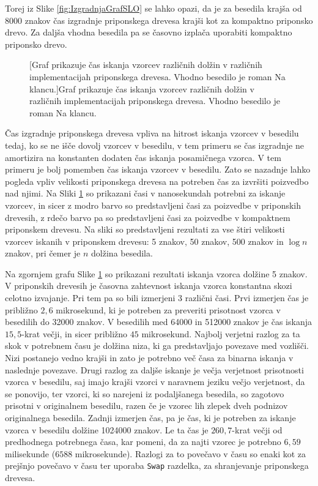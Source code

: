 Torej iz Slike \ref{fig:IzgradnjaGrafSLO} se lahko opazi, da je za besedila krajša od 8000 znakov čas izgradnje priponskega drevesa krajši kot za kompaktno priponsko drevo. Za daljša vhodna besedila pa se časovno izplača uporabiti kompaktno priponsko drevo.


\begin{figure}[htb]
    
    [Graf prikazuje čas iskanja vzorcev različnih dolžin v različnih implementacijah priponskega drevesa. Vhodno besedilo je roman Na klancu.]{Graf prikazuje čas iskanja vzorcev različnih dolžin v različnih implementacijah priponskega drevesa. Vhodno besedilo je roman Na klancu.} 
    \label{fig:IskanjeGrafSLO}
\end{figure}

Čas izgradnje priponskega drevesa vpliva na hitrost iskanja  vzorcev v besedilu tedaj, ko se ne išče dovolj vzorcev v besedilu, v tem primeru se čas izgradnje ne amortizira na konstanten dodaten čas iskanja posamičnega vzorca. V tem primeru je bolj pomemben čas iskanja vzorcev v besedilu. Zato se nazadnje lahko pogleda vpliv velikosti priponskega drevesa na potreben čas za izvršiti poizvedbo nad njimi. Na Sliki \ref{fig:IskanjeGrafSLO} so prikazani časi v nanosekundah potrebni za iskanje vzorcev, in sicer z modro barvo so predstavljeni časi za poizvedbe v priponskih drevesih, z rdečo barvo pa so predstavljeni časi za poizvedbe v kompaktnem priponskem drevesu. Na sliki so predstavljeni rezultati za vse štiri velikosti vzorcev iskanih v priponskem drevesu: 5 znakov, 50 znakov, 500 znakov in $\log{n}$ znakov, pri čemer je $n$ dolžina besedila.

Na zgornjem grafu Slike \ref{fig:IskanjeGrafSLO} so prikazani rezultati iskanja vzorca dolžine 5 znakov. V priponskih drevesih je časovna zahtevnost iskanja vzorca konstantna skozi celotno izvajanje. Pri tem pa so bili izmerjeni 3 različni časi. Prvi izmerjen čas je približno $2,6$ mikrosekund, ki je potreben za preveriti prisotnost vzorca v besedilih do 32000 znakov. V besedilih med 64000 in 512000 znakov je čas iskanja $15,5$-krat večji, in sicer približno $45$ mikrosekund. Najbolj verjetni razlog za ta skok v potrebnem času je dolžina niza, ki ga predstavljajo povezave med vozlišči. Nizi postanejo vedno krajši in zato je potrebno več časa za binarna iskanja v naslednje povezave. Drugi razlog za daljše iskanje je večja verjetnost prisotnosti vzorca v besedilu, saj imajo krajši vzorci v naravnem jeziku večjo verjetnost, da se ponovijo, ter vzorci, ki so narejeni iz podaljšanega besedila, so zagotovo prisotni v originalnem besedilu, razen če je vzorec lih zlepek dveh podnizov originalnega besedila. Zadnji izmerjen čas, pa je čas, ki je potreben za iskanje vzorca v besedilu dolžine 1024000 znakov. Le ta čas je $260,7$-krat večji od predhodnega potrebnega časa, kar pomeni, da za najti vzorec je potrebno $6,59$ milisekunde ($6588$ mikrosekunde). Razlogi za to povečavo v času so enaki kot za prejšnjo povečavo v času ter uporaba \verb|Swap| razdelka, za shranjevanje priponskega drevesa.

